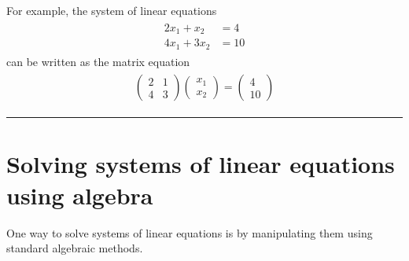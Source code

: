 \documentclass[letterpaper,10pt,english]{jupyterBook}
\begin{document}
\sphinxAtStartPar
For example, the system of linear equations
\begin{equation*}
\begin{split} \begin{align*}
    2x_1 + x_2 &= 4 \\
    4x_1 + 3x_2 &= 10
\end{align*} \end{split}
\end{equation*}
\sphinxAtStartPar
can be written as the matrix equation
\begin{equation*}
\begin{split} \begin{align*}
    \begin{pmatrix}
        2 & 1 \\
        4 & 3
    \end{pmatrix}
    \begin{pmatrix}
        x_1 \\ x_2
    \end{pmatrix} =
    \begin{pmatrix}
        4 \\ 10
    \end{pmatrix}
\end{align*} \end{split}
\end{equation*}

\bigskip\hrule\bigskip



\section{Solving systems of linear equations using algebra}
\label{\detokenize{_pages/2.0_Linear_systems:solving-systems-of-linear-equations-using-algebra}}\label{\detokenize{_pages/2.0_Linear_systems:solving-systems-of-linear-equations-using-algebra-section}}
\sphinxAtStartPar
One way to solve systems of linear equations is by manipulating them using standard algebraic methods.
\end{document}
